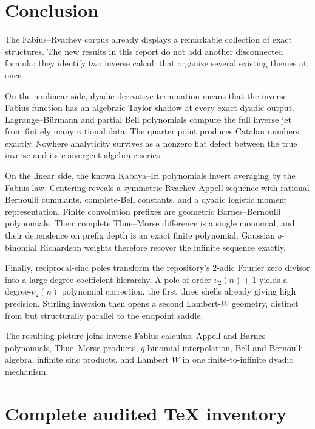 \documentclass[11pt,oneside]{article}
\theoremstyle{frontier}
\theoremstyle{definition}
\theoremstyle{remark}
\newcommand{\vtwo}{\nu_2}
\begin{document}
\section{Conclusion}

The Fabius--Rvachev corpus already displays a remarkable collection of exact structures.  The new
results in this report do not add another disconnected formula; they identify two inverse calculi
that organize several existing themes at once.

On the nonlinear side, dyadic derivative termination means that the inverse Fabius function has an
algebraic Taylor shadow at every exact dyadic output.  Lagrange--B\"urmann and partial Bell
polynomials compute the full inverse jet from finitely many rational data.  The quarter point produces
Catalan numbers exactly.  Nowhere analyticity survives as a nonzero flat defect between the true
inverse and its convergent algebraic series.

On the linear side, the known Kabaya--Iri polynomials invert averaging by the Fabius law.  Centering
reveals a symmetric Rvachev-Appell sequence with rational Bernoulli cumulants, complete-Bell
constants, and a dyadic logistic moment representation.  Finite convolution prefixes are geometric
Barnes--Bernoulli polynomials.  Their complete Thue--Morse difference is a single monomial, and
their dependence on prefix depth is an exact finite polynomial.  Gaussian $q$-binomial Richardson
weights therefore recover the infinite sequence exactly.

Finally, reciprocal-sinc poles transform the repository's $2$-adic Fourier zero divisor into a
large-degree coefficient hierarchy.  A pole of order $\vtwo(n)+1$ yields a degree-$\vtwo(n)$
polynomial correction, the first three shells already giving high precision.  Stirling inversion then
opens a second Lambert-$W$ geometry, distinct from but structurally parallel to the endpoint saddle.

The resulting picture joins inverse Fabius calculus, Appell and Barnes polynomials, Thue--Morse
products, $q$-binomial interpolation, Bell and Bernoulli algebra, infinite sinc products, and Lambert
$W$ in one finite-to-infinite dyadic mechanism.

\appendix

\section{Complete audited TeX inventory}
\label{app:inventory}
\end{document}
